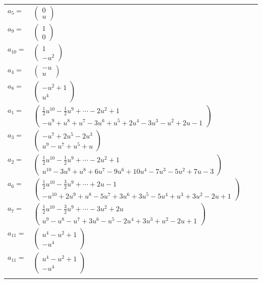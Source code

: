\documentclass[1p]{elsarticle_modified}
\theoremstyle{definition}
\begin{document}
\begin{tabular}{m{7pt} m{180pt} m{7pt} m{180pt} }
\flushright $a_{5}=$&$\begin{pmatrix}0\\u\end{pmatrix}$ \\
\flushright $a_{9}=$&$\begin{pmatrix}1\\0\end{pmatrix}$ \\
\flushright $a_{10}=$&$\begin{pmatrix}1\\- u^2\end{pmatrix}$ \\
\flushright $a_{4}=$&$\begin{pmatrix}- u\\u\end{pmatrix}$ \\
\flushright $a_{8}=$&$\begin{pmatrix}- u^2+1\\u^4\end{pmatrix}$ \\
\flushright $a_{1}=$&$\begin{pmatrix}\frac{1}{2} u^{10}-\frac{1}{2} u^9+\cdots-2 u^2+1\\- u^9+u^8+u^7-3 u^6+u^5+2 u^4-3 u^3- u^2+2 u-1\end{pmatrix}$ \\
\flushright $a_{3}=$&$\begin{pmatrix}- u^7+2 u^5-2 u^3\\u^9- u^7+u^5+u\end{pmatrix}$ \\
\flushright $a_{2}=$&$\begin{pmatrix}\frac{1}{2} u^{10}-\frac{1}{2} u^9+\cdots-2 u^2+1\\u^{10}-3 u^9+u^8+6 u^7-9 u^6+10 u^4-7 u^3-5 u^2+7 u-3\end{pmatrix}$ \\
\flushright $a_{6}=$&$\begin{pmatrix}\frac{1}{2} u^{10}-\frac{3}{2} u^9+\cdots+2 u-1\\- u^{10}+2 u^9+u^8-5 u^7+3 u^6+3 u^5-5 u^4+u^3+3 u^2-2 u+1\end{pmatrix}$ \\
\flushright $a_{7}=$&$\begin{pmatrix}\frac{1}{2} u^{10}-\frac{3}{2} u^9+\cdots-3 u^2+2 u\\u^9- u^8- u^7+3 u^6- u^5-2 u^4+3 u^3+u^2-2 u+1\end{pmatrix}$ \\
\flushright $a_{11}=$&$\begin{pmatrix}u^4- u^2+1\\- u^4\end{pmatrix}$\\ \flushright $a_{11}=$&$\begin{pmatrix}u^4- u^2+1\\- u^4\end{pmatrix}$\\&\end{tabular}
\end{document}
